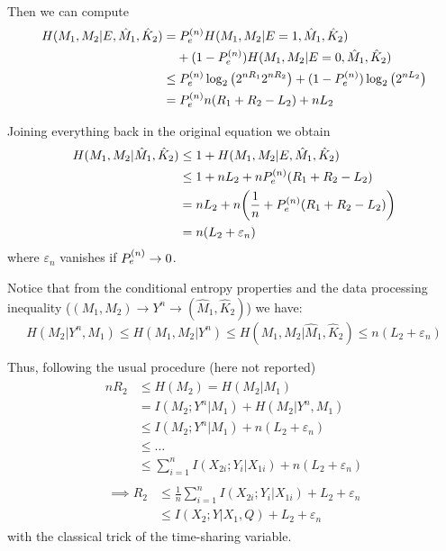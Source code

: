 Then we can compute
%
\begin{align}
\begin{split}
H(M_1,M_2|E,\hat{M}_1,\hat{K}_2) &= \Pen H(M_1,M_2|E=1,\hat{M}_1,\hat{K}_2)\\
&\hphantom{={}} + (1-\Pen) H(M_1,M_2|E=0,\hat{M}_1,\hat{K}_2)\\
&\leq \Pen \log_2 \qty(2^{nR_1}2^{nR_2}) + (1-\Pen) \log_2 \qty(2^{nL_2})\\
&= \Pen n(R_1+R_2-L_2) + nL_2
\end{split}
\end{align}

Joining everything back in the original equation we obtain
\begin{align}
\begin{split}
H(M_1,M_2|\hat{M}_1,\hat{K}_2) &\leq 1 + H(M_1,M_2|E,\hat{M}_1,\hat{K}_2)\\
&\leq 1 + nL_2 + n P_e^{(n)}  (R_1+R_2-L_2)\\
&= nL_2 + n \qty(\frac{1}{n} +  P_e^{(n)}  (R_1+R_2-L_2))\\
&= n (L_2 + \varepsilon_n)
\end{split}
\end{align}
where $\varepsilon_n$ vanishes if $ P_e^{(n)}  \rightarrow 0$.

Notice that from the conditional entropy properties and the data processing inequality ($(M_1,M_2)\rightarrow Y^n \rightarrow (\hat{M}_1,\hat{K}_2)$) we have:
%
\begin{equation}
H(M_2|Y^n,M_1) \leq H(M_1,M_2|Y^n) \leq H(M_1,M_2|\hat{M}_1,\hat{K}_2) \leq n(L_2 + \varepsilon_n)
\end{equation}

Thus, following the usual procedure (here not reported)
%
\begin{align}
\begin{split}
nR_2 &\leq H(M_2) = H(M_2|M_1)\\
&= I(M_2;Y^n|M_1) + H(M_2|Y^n,M_1)\\
&\leq I(M_2;Y^n|M_1) + n(L_2 + \varepsilon_n)\\
&\leq \ldots\\
&\leq \sum_{i=1}^n I(X_{2i};Y_i|X_{1i}) + n(L_2 + \varepsilon_n)
\end{split}
\end{align}
\begin{eqnarray}
\begin{split}
\implies R_2 &\leq \frac{1}{n} \sum_{i=1}^n I(X_{2i};Y_i|X_{1i}) + L_2 + \varepsilon_n\\
&\leq I(X_2;Y|X_1,Q) + L_2 + \varepsilon_n
\end{split}
\end{eqnarray}
%
with the classical trick of the time-sharing variable.

